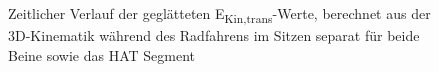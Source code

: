 \documentclass[
  letterpaper,
  DIV=11]{scrartcl}
\begin{document}
\begin{figure}


\caption{\label{fig-PInt_Kinematik_HAT_Ekin_trans_sitzen}Zeitlicher
Verlauf der geglätteten E\textsubscript{Kin,trans}-Werte, berechnet aus
der 3D-Kinematik während des Radfahrens im Sitzen separat für beide
Beine sowie das HAT Segment}

\end{figure}%
\end{document}
